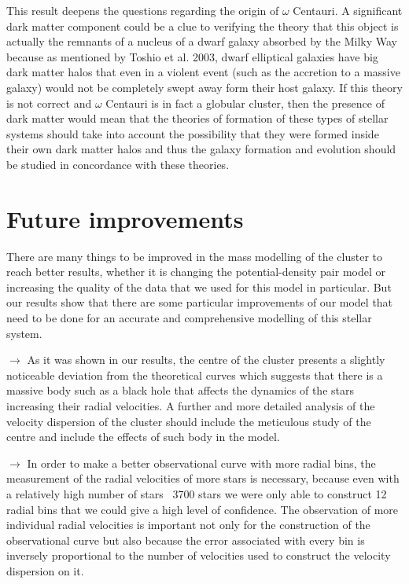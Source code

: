 This result deepens the questions regarding the origin of $\omega$ Centauri. A significant dark matter component could be a clue to verifying the theory that this object is actually the remnants of a nucleus of a dwarf galaxy absorbed by the Milky Way because as mentioned by Toshio et al. 2003, dwarf elliptical galaxies have big dark matter halos that even in a violent event (such as the accretion to a massive galaxy) would not be completely swept away form their host galaxy. If this theory is not correct and $\omega$ Centauri is in fact a globular cluster, then the presence of dark matter would mean that the theories of formation of these types of stellar systems should take into account the possibility that they were formed inside their own dark matter halos and thus the galaxy formation and evolution should be studied in concordance with these theories. 

\section{Future improvements}

There are many things to be improved in the mass modelling of the cluster to reach better results, whether it is changing the potential-density pair model or increasing the quality of the data that we used for this model in particular. But our results show that there are some particular improvements of our model that need to be done for an accurate and comprehensive modelling of this stellar system.

$\rightarrow$ As it was shown in our results, the centre of the cluster presents a slightly noticeable deviation from the theoretical curves which suggests that there is a massive body such as a black hole that affects the dynamics of the stars increasing their radial velocities. A further and more detailed analysis of the velocity dispersion of the cluster should include the meticulous study of the centre and include the effects of such body in the model.

$\rightarrow$ In order to make a better observational curve with more radial bins, the measurement of the radial velocities of more stars is necessary, because even with a relatively high number of stars ~3700 stars we were only able to construct 12 radial bins that we could give a high level of confidence. The observation of more individual radial velocities is important not only for the construction of the observational curve but also because the error associated with every bin is inversely proportional to the number of velocities used to construct the velocity dispersion on it. 

